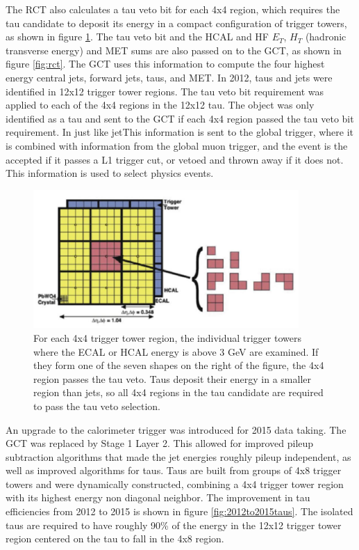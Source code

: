 \documentclass[oneside, letterpaper, oldfontcommands]{memoir}
\begin{document}
\qquad The RCT also calculates a tau veto bit for each 4x4 region, which requires the tau candidate to deposit its energy in a compact configuration of trigger towers, as shown in figure \ref{fig:tauveto}. The tau veto bit and the HCAL and HF $E_{T}$, $H_{T}$ (hadronic transverse energy) and MET sums are also passed on to the GCT, as shown in figure \ref{fig:rct}. The GCT uses this information to compute the four highest energy central jets, forward jets, taus, and MET. In 2012, taus and jets were identified in 12x12 trigger tower regions. The tau veto bit requirement was applied to each of the 4x4 regions in the 12x12 tau. The object was only identified as a tau and sent to the GCT if each 4x4 region passed the tau veto bit requirement. In   just like jetThis information is sent to the global trigger, where it is combined with information from the global muon trigger, and the event is the accepted if it passes a L1 trigger cut, or vetoed and thrown away if it does not. This information is used to select physics events. 

\begin{figure}[here]
\includegraphics[width=0.9\textwidth]{tauveto.jpg}
\caption{For each 4x4 trigger tower region, the individual trigger towers where the ECAL or HCAL energy is above 3 GeV are examined. If they form one of the seven shapes on the right of the figure, the 4x4 region passes the tau veto. Taus deposit their energy in a smaller region than jets, so all 4x4 regions in the tau candidate are required to pass the tau veto selection\cite{CMS-DP-2015-009}.}
\label{fig:tauveto}
\end{figure}

\qquad An upgrade to the calorimeter trigger was introduced for 2015 data taking. The GCT was replaced by Stage 1 Layer 2. This allowed for improved pileup subtraction algorithms that made the jet energies roughly pileup independent, as well as improved algorithms for taus. Taus are built from groups of 4x8 trigger towers and were dynamically constructed, combining a 4x4 trigger tower region with its highest energy non diagonal neighbor. The improvement in tau efficiencies from 2012 to 2015 is shown in figure \ref{fig:2012to2015taus}. The isolated taus are required to have roughly 90\% of the energy in the 12x12 trigger tower region centered on the tau to fall in the 4x8 region.
\end{document}
